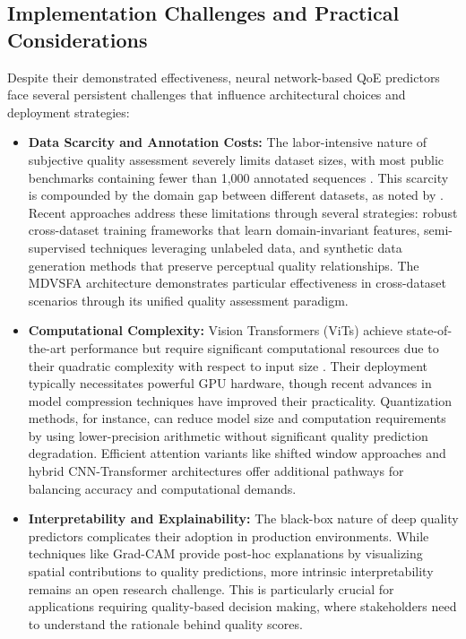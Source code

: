\subsection{Implementation Challenges and Practical Considerations}  
Despite their demonstrated effectiveness, neural network-based QoE predictors face several persistent challenges that influence architectural choices and deployment strategies:

\begin{itemize}  
    \item \textbf{Data Scarcity and Annotation Costs:} The labor-intensive nature of subjective quality assessment severely limits dataset sizes, with most public benchmarks containing fewer than 1,000 annotated sequences \cite{hosu2020konvid}. This scarcity is compounded by the domain gap between different datasets, as noted by \cite{li2023unified}. Recent approaches address these limitations through several strategies: robust cross-dataset training frameworks that learn domain-invariant features, semi-supervised techniques leveraging unlabeled data, and synthetic data generation methods that preserve perceptual quality relationships. The MDVSFA architecture \cite{li2023unified} demonstrates particular effectiveness in cross-dataset scenarios through its unified quality assessment paradigm.
    
    \item \textbf{Computational Complexity:} Vision Transformers (ViTs) achieve state-of-the-art performance but require significant computational resources due to their quadratic complexity with respect to input size \cite{liu2021swin}. Their deployment typically necessitates powerful GPU hardware, though recent advances in model compression techniques have improved their practicality. Quantization methods, for instance, can reduce model size and computation requirements by using lower-precision arithmetic without significant quality prediction degradation. Efficient attention variants like shifted window approaches and hybrid CNN-Transformer architectures offer additional pathways for balancing accuracy and computational demands.
    
    \item \textbf{Interpretability and Explainability:} The black-box nature of deep quality predictors complicates their adoption in production environments. While techniques like Grad-CAM \cite{selvaraju2017grad} provide post-hoc explanations by visualizing spatial contributions to quality predictions, more intrinsic interpretability remains an open research challenge. This is particularly crucial for applications requiring quality-based decision making, where stakeholders need to understand the rationale behind quality scores.
\end{itemize}  

